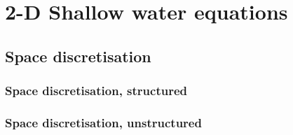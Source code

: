 \documentclass[subfooter]{mooiman_report}
\begin{document}
\chapter{2-D Shallow water equations}
\section{Space discretisation}
\subsection{Space discretisation, structured}
\subsection{Space discretisation, unstructured}
\printallbibliography
\appendix


\end{document}
